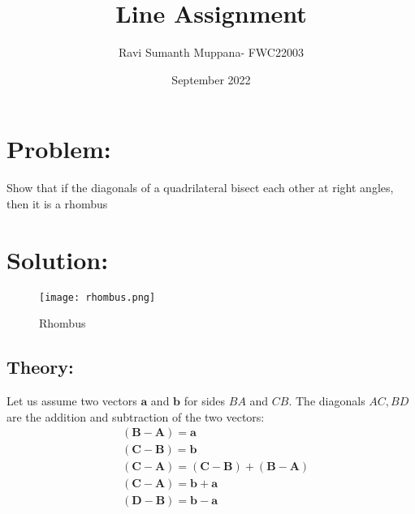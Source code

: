 \documentclass[a4paper,12pt,twocolumn]{article}
\title{Line Assignment}
\author{Ravi Sumanth Muppana- FWC22003}
\date{September 2022}
\let\vec\mathbf
\begin{document}
\maketitle
\section{Problem:}
Show that if the diagonals of a quadrilateral bisect each other at right angles, then it is a rhombus
\maketitle
\section{Solution:}
\begin{figure}[h]
	\texttt{[image: rhombus.png]}
	\caption{Rhombus}
\end{figure}
\subsection{Theory:}
Let us assume two vectors $\vec{a}$ and $\vec{b}$ for sides $BA$ and $CB$. The diagonals $AC,BD$ are the addition and subtraction of the two vectors:
\begin{align}
	&\vec{(B-A)} = \vec{a}\\
	&\vec{(C-B)} = \vec{b}\\
	&\vec{(C-A)} = \vec{(C-B)} +\vec{(B-A)}\\
	&\vec{(C-A)} = \vec{b+a}\\
	&\vec{(D-B)} = \vec{b-a}\\
\end{align}
\end{document}
